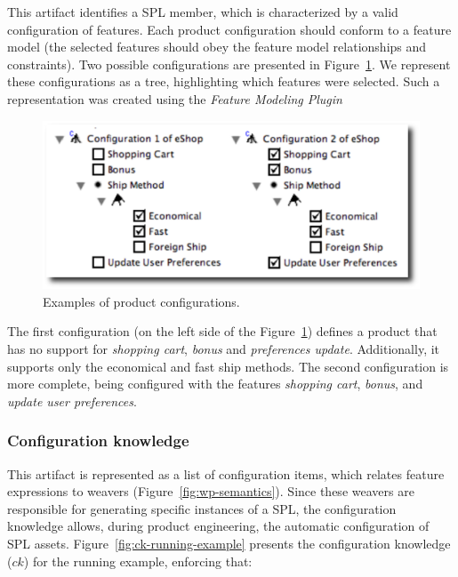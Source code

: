 \documentclass{acm_proc_article-sp}
\begin{document}
This artifact identifies a SPL member, which is characterized by a valid
configuration of features. Each product configuration should conform to a
feature model (the selected features should obey the feature model relationships and constraints). Two possible configurations are presented in
Figure~\ref{fig:product-config-01-02}. We represent these configurations as a
tree, highlighting which features were selected. Such a representation was
created using the \emph{Feature Modeling Plugin}~\cite{czarnecki-eclipse-2004}

 \begin{figure}[h]
 \begin{center}
  \includegraphics[scale=0.33]{img/pc-04.eps}
   \caption{Examples of product configurations.}
  \label{fig:product-config-01-02}
  \end{center}
\end{figure}

  
The first configuration (on the left side of the
Figure~\ref{fig:product-config-01-02}) defines a product that has no support for
\emph{shopping cart}, \emph{bonus} and \emph{preferences update}. Additionally,
it supports only the economical and fast ship methods. The second configuration
is more complete, being configured with the features \emph{shopping cart},
\emph{bonus}, and \emph{update user preferences}.

\subsubsection{Configuration knowledge}

This artifact is represented as a list of configuration items, which relates
feature expressions to weavers (Figure~\ref{fig:wp-semantics}). Since these
weavers are responsible for generating specific instances of a SPL,
the configuration knowledge allows, during product engineering, the automatic
configuration of SPL assets. Figure~\ref{fig:ck-running-example} presents the
configuration knowledge ($ck$) for the running example, enforcing that:
\end{document}
